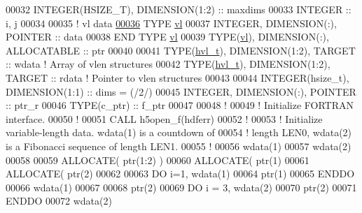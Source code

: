 \begin{DoxyCode}
00032   \textcolor{keywordtype}{INTEGER(HSIZE\_T)}, \textcolor{keywordtype}{DIMENSION(1:2)}   :: maxdims
00033   \textcolor{keywordtype}{INTEGER} :: i, j
00034 
00035   \textcolor{comment}{! vl data}
\hyperlink{structvl}{00036}   \textcolor{keyword}{TYPE} \hyperlink{structvl}{vl}
00037      \textcolor{keywordtype}{INTEGER}, \textcolor{keywordtype}{DIMENSION(:)}, \textcolor{keywordtype}{POINTER} :: data
00038 \textcolor{keyword}{  END TYPE }\hyperlink{structvl}{vl}
00039   \textcolor{keywordtype}{TYPE}(\hyperlink{structvl}{vl}), \textcolor{keywordtype}{DIMENSION(:)}, \textcolor{keywordtype}{ALLOCATABLE} :: ptr
00040 
00041   \textcolor{keywordtype}{TYPE}(\hyperlink{structhvl__t}{hvl\_t}), \textcolor{keywordtype}{DIMENSION(1:2)}, \textcolor{keywordtype}{TARGET} :: wdata \textcolor{comment}{! Array of vlen structures}
00042   \textcolor{keywordtype}{TYPE}(\hyperlink{structhvl__t}{hvl\_t}), \textcolor{keywordtype}{DIMENSION(1:2)}, \textcolor{keywordtype}{TARGET} :: rdata \textcolor{comment}{! Pointer to vlen structures}
00043 
00044   \textcolor{keywordtype}{INTEGER(hsize\_t)}, \textcolor{keywordtype}{DIMENSION(1:1)} :: dims = (/2/)
00045   \textcolor{keywordtype}{INTEGER}, \textcolor{keywordtype}{DIMENSION(:)}, \textcolor{keywordtype}{POINTER} :: ptr\_r 
00046   \textcolor{keywordtype}{TYPE}(c\_ptr) :: f\_ptr
00047   
00048   \textcolor{comment}{!}
00049   \textcolor{comment}{! Initialize FORTRAN interface.}
00050   \textcolor{comment}{!}
00051   \textcolor{keyword}{CALL }h5open\_f(hdferr)
00052   \textcolor{comment}{!}
00053   \textcolor{comment}{! Initialize variable-length data.  wdata(1) is a countdown of}
00054   \textcolor{comment}{! length LEN0, wdata(2) is a Fibonacci sequence of length LEN1.}
00055   \textcolor{comment}{!}
00056   wdata(1)%
00057   wdata(2)%
00058 
00059   \textcolor{keyword}{ALLOCATE}( ptr(1:2) )
00060   \textcolor{keyword}{ALLOCATE}( ptr(1)%
00061   \textcolor{keyword}{ALLOCATE}( ptr(2)%
00062 
00063   \textcolor{keywordflow}{DO} i=1, wdata(1)%
00064      ptr(1)%
00065 \textcolor{keywordflow}{  ENDDO}
00066   wdata(1)%
00067 
00068   ptr(2)%
00069   \textcolor{keywordflow}{DO} i = 3, wdata(2)%
00070      ptr(2)%
00071 \textcolor{keywordflow}{  ENDDO}
00072   wdata(2)%

\end{DoxyCode}
